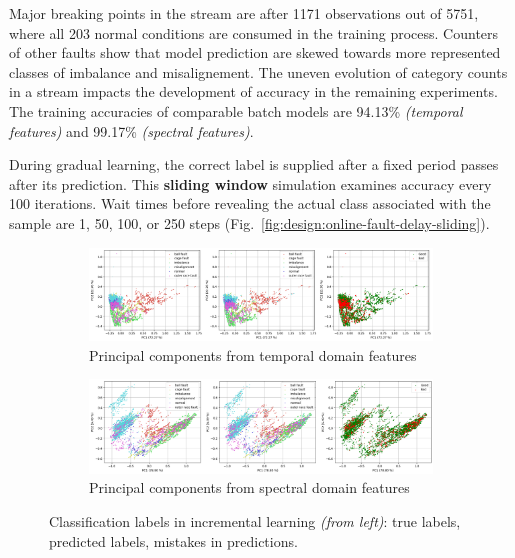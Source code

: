 Major breaking points in the stream are after 1171 observations out of 5751, where all 203 normal conditions are consumed in the training process. Counters of other faults show that model prediction are skewed towards more represented classes of imbalance and misalignement. The uneven evolution of category counts in a stream impacts the development of accuracy in the remaining experiments. The training accuracies of comparable batch models are 94.13\% \emph{(temporal features)} and 99.17\% \emph{(spectral features)}.
	
During gradual learning, the correct label is supplied after a fixed period passes after its prediction. This \textbf{sliding window} simulation examines accuracy every 100 iterations. Wait times before revealing the actual class associated with the sample are 1, 50, 100, or 250 steps (Fig.~\ref{fig:design:online-fault-delay-sliding}). 


\begin{figure}[ht]
    \centering
    \begin{subfigure}[b]{\textwidth}
        \includegraphics[width=\textwidth]{assets/design/pca-scatter-online-fault-temporal.png}
        \caption{Principal components from temporal domain features}
    \end{subfigure}
    \hfill
    \begin{subfigure}[b]{\textwidth}
        \includegraphics[width=\textwidth]{assets/design/pca-scatter-online-fault-spectral.png}
        \caption{Principal components from spectral domain features}
    \end{subfigure}
    \caption{Classification labels in incremental learning \emph{(from left)}: true labels, predicted labels, mistakes in predictions.}
    \label{fig:design:scatter-plot-online}
\end{figure}

